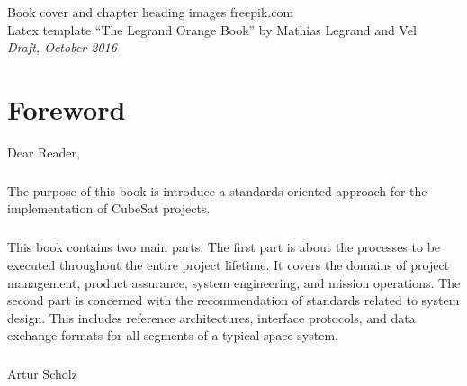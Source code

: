 \documentclass[11pt,fleqn]{book} %
\begin{document}
\noindent Book cover and chapter heading images \textcopyright freepik.com \\

\noindent Latex template ``The Legrand Orange Book'' by Mathias Legrand and Vel \\

\noindent \textit{Draft, October 2016} %


\chapter*{Foreword}

Dear Reader,

\paragraph{}

The purpose of this book is introduce a standards-oriented approach for the implementation of CubeSat projects.  

\paragraph{}

This book contains two main parts. The first part is about the processes to be executed throughout the entire project lifetime. It covers the domains of project management, product assurance, system engineering, and mission operations. The second part is concerned with the recommendation of standards related to system design. This includes reference architectures, interface protocols, and data exchange formats for all segments of a typical space system. 

\paragraph{}

\begin{flushright}
Artur Scholz
\end{flushright}

\end{document}
